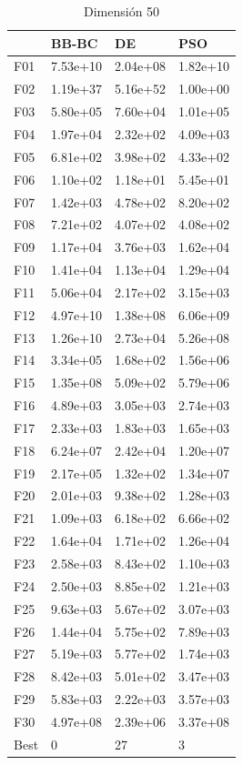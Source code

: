 \begin{table}[H]
    \begin{minipage}{.5\linewidth}
      \caption{Dimensión 50}
      \centering
      \begin{tabular}{llll}
        \toprule
        {} &     BB-BC &        DE &       PSO \\
        \midrule
        F01  &  7.53e+10 &  2.04e+08 &  1.82e+10 \\
        F02  &  1.19e+37 &  5.16e+52 &  1.00e+00 \\
        F03  &  5.80e+05 &  7.60e+04 &  1.01e+05 \\
        F04  &  1.97e+04 &  2.32e+02 &  4.09e+03 \\
        F05  &  6.81e+02 &  3.98e+02 &  4.33e+02 \\
        F06  &  1.10e+02 &  1.18e+01 &  5.45e+01 \\
        F07  &  1.42e+03 &  4.78e+02 &  8.20e+02 \\
        F08  &  7.21e+02 &  4.07e+02 &  4.08e+02 \\
        F09  &  1.17e+04 &  3.76e+03 &  1.62e+04 \\
        F10  &  1.41e+04 &  1.13e+04 &  1.29e+04 \\
        F11  &  5.06e+04 &  2.17e+02 &  3.15e+03 \\
        F12  &  4.97e+10 &  1.38e+08 &  6.06e+09 \\
        F13  &  1.26e+10 &  2.73e+04 &  5.26e+08 \\
        F14  &  3.34e+05 &  1.68e+02 &  1.56e+06 \\
        F15  &  1.35e+08 &  5.09e+02 &  5.79e+06 \\
        F16  &  4.89e+03 &  3.05e+03 &  2.74e+03 \\
        F17  &  2.33e+03 &  1.83e+03 &  1.65e+03 \\
        F18  &  6.24e+07 &  2.42e+04 &  1.20e+07 \\
        F19  &  2.17e+05 &  1.32e+02 &  1.34e+07 \\
        F20  &  2.01e+03 &  9.38e+02 &  1.28e+03 \\
        F21  &  1.09e+03 &  6.18e+02 &  6.66e+02 \\
        F22  &  1.64e+04 &  1.71e+02 &  1.26e+04 \\
        F23  &  2.58e+03 &  8.43e+02 &  1.10e+03 \\
        F24  &  2.50e+03 &  8.85e+02 &  1.21e+03 \\
        F25  &  9.63e+03 &  5.67e+02 &  3.07e+03 \\
        F26  &  1.44e+04 &  5.75e+02 &  7.89e+03 \\
        F27  &  5.19e+03 &  5.77e+02 &  1.74e+03 \\
        F28  &  8.42e+03 &  5.01e+02 &  3.47e+03 \\
        F29  &  5.83e+03 &  2.22e+03 &  3.57e+03 \\
        F30  &  4.97e+08 &  2.39e+06 &  3.37e+08 \\
        Best &         0 &        27 &         3 \\
        \bottomrule
        \end{tabular}
        

\end{minipage}
\end{table}
